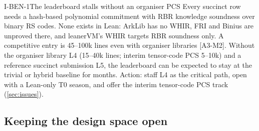 \begin{issue}{I-BEN-1}{The leaderboard stalls without an organiser PCS}
Every succinct row needs a hash-based polynomial commitment with RBR knowledge soundness over binary
RS codes. None exists in Lean: ArkLib has no WHIR, FRI and Binius are unproved there, and leanerVM's
WHIR targets RBR soundness only. A competitive entry is 45--100k lines even with organiser libraries
[A3-M2]. Without the organiser library L4 (15--40k lines; interim tensor-code PCS 5--10k) and a
reference succinct submission L5, the leaderboard can be expected to stay at the trivial or hybrid
baseline for months. Action: staff L4 as the critical path, open with a Lean-only T0 season, and offer
the interim tensor-code PCS track (\cref{sec:issues}).
\end{issue}

\subsection{Keeping the design space open}\label{subsec:bench-open}

